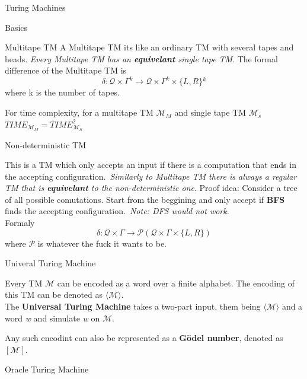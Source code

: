 \documentclass[12pt, letterpaper]{article}
\begin{document}
\begin{section}{Turing Machines}
\begin{subsection}{Basics}
\begin{subsubsection}{Multitape TM}
      A Multitape TM its like an ordinary TM with several tapes and heads.
      \emph{Every Multitape TM has an \textbf{equivelant} single tape TM}.
      The formal difference of the Multitape TM is
      \[\delta: \mathcal{Q} \times \Gamma^{k} \to \mathcal{Q} \times \Gamma^{k} \times \{{} L, R \}{}^{k}\]
      where k is the number of tapes.

      For time complexity, for a multitape TM \(\mathscr{M}_{M}\) and single tape
      TM \(\mathscr{M}_{s}\) \linebreak \(TIME_{\mathscr{M}_{M}} = TIME_{\mathscr{M}_{S}}^{2}\)

    \end{subsubsection}

    \begin{subsubsection}{Non-deterministic TM}

      This is a TM which only accepts an input if there is a computation
      that ends in the accepting configuration.\ \emph{Similarly to Multitape TM
        there is always a regular TM that is \textbf{equivelant}
        to the non-deterministic one}. Proof idea: Consider a tree
      of all possible comutations. Start from the beggining and only accept if
      \textbf{BFS} finds the accepting configuration.\ \textit{Note: DFS would not work}. \\
      Formaly
      \[\delta: \mathcal{Q} \times \Gamma \to \mathscr{P}(\mathcal{Q} \times \Gamma \times \{{} L, R \}{})\]
      where \(\mathscr{P}\) is whatever the fuck it wants to be.
      
    \end{subsubsection}

    \begin{subsubsection}{Univeral Turing Machine}

      Every TM \(\mathscr{M}\) can be encoded as a word over a finite alphabet.
      The encoding of this TM can be denoted as \(\langle \mathscr{M} \rangle\). \\
      The \textbf{Universal Turing Machine} takes a two-part input, them being
      \(\langle \mathscr{M} \rangle\) and a word \textit{w} and simulate
      \textit{w} on \(\mathscr{M}\).

      Any such encodint can also be represented as a \textbf{Gödel number},
      denoted as \([\mathscr{M}]\).

    \end{subsubsection}

    \begin{subsubsection}{Oracle Turing Machine}


\end{subsubsection}
\end{subsection}
\end{section}
\end{document}
